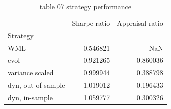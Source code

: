 \begin{table}[htbp]
  \centering
  \caption{table 07 strategy performance}
  \label{tab:table_07_strategy_performance}
  \begin{tabular}{lrr}
\toprule
 & Sharpe ratio & Appraisal ratio \\
Strategy &  &  \\
\midrule
WML & 0.546821 & NaN \\
cvol & 0.921265 & 0.860036 \\
variance scaled & 0.999944 & 0.388798 \\
dyn, out-of-sample & 1.019012 & 0.196433 \\
dyn, in-sample & 1.059777 & 0.300326 \\
\bottomrule
\end{tabular}

\end{table}
